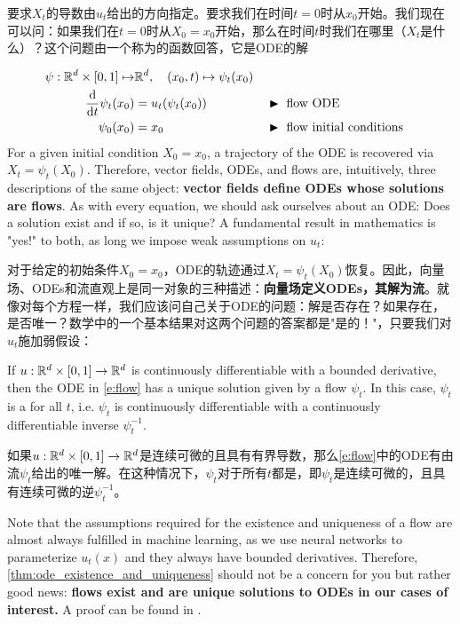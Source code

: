 要求$X_t$的导数由$u_t$给出的方向指定。要求我们在时间$t=0$时从$x_0$开始。我们现在可以问：如果我们在$t=0$时从$X_0 = x_0$开始，那么在时间$t$时我们在哪里（$X_t$是什么）？这个问题由一个称为的函数回答，它是ODE的解

\begin{subequations}\label{e:flow}
    \begin{align}
    \psi:\mathbb{R}^d\times [0,1]\mapsto& \mathbb{R}^d,\quad (x_0,t)\mapsto \psi_t(x_0)\\
      \frac{\mathrm{d}}{\mathrm{d} t}\psi_{t}(x_0) &= u_t(\psi_{t}(x_0)) &&\blacktriangleright\,\, \text{flow ODE}\label{e:flow_flow}\\
      \psi_{0}(x_0)             &= x_0                &&\blacktriangleright\,\,\text{flow initial conditions}\label{e:flow_boundary} 
    \end{align}
\end{subequations}
For a given initial condition $X_0=x_0$, a trajectory of the ODE is recovered via $X_t = \psi_t(X_0)$. Therefore, vector fields, ODEs, and flows are, intuitively, three descriptions of the same object: \textbf{vector fields define ODEs whose solutions are flows}. As with every equation, we should ask ourselves about an ODE: Does a solution exist and if so, is it unique? A fundamental result in mathematics is "yes!" to both, as long we impose weak assumptions on $u_t$:

对于给定的初始条件$X_0=x_0$，ODE的轨迹通过$X_t = \psi_t(X_0)$恢复。因此，向量场、ODEs和流直观上是同一对象的三种描述：\textbf{向量场定义ODEs，其解为流}。就像对每个方程一样，我们应该问自己关于ODE的问题：解是否存在？如果存在，是否唯一？数学中的一个基本结果对这两个问题的答案都是"是的！"，只要我们对$u_t$施加弱假设：

\begin{theorem}
\label{thm:ode_existence_and_uniqueness}
If $u:\mathbb{R}^d\times[0,1]\to\mathbb{R}^d$ is continuously differentiable with a bounded derivative, then the ODE in \eqref{e:flow} has a unique solution given by a flow $\psi_t$. In this case, $\psi_t$ is a  for all $t$, i.e. $\psi_t$ is continuously differentiable with a continuously differentiable inverse $\psi_t^{-1}$.

如果$u:\mathbb{R}^d\times[0,1]\to\mathbb{R}^d$是连续可微的且具有有界导数，那么\eqref{e:flow}中的ODE有由流$\psi_t$给出的唯一解。在这种情况下，$\psi_t$对于所有$t$都是，即$\psi_t$是连续可微的，且具有连续可微的逆$\psi_t^{-1}$。
\end{theorem}
Note that the assumptions required for the existence and uniqueness of a flow are almost always fulfilled in machine learning, as we use neural networks to parameterize $u_t(x)$ and they always have bounded derivatives. Therefore, \cref{thm:ode_existence_and_uniqueness} should not be a concern for you but rather good news: \textbf{flows exist and are unique solutions to ODEs in our cases of interest.} A proof can be found in \citep{perko2013differential,coddington1956theory}.

